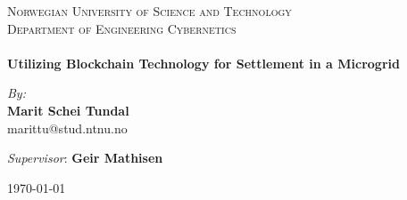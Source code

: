 
\begin{center}

\textsc{\LARGE Norwegian University of Science and Technology}\\[0.8cm] 
\textsc{\Large Department of Engineering Cybernetics}\\[0.6cm]

\HRule \\[0.4cm]
{ \huge \bfseries Utilizing Blockchain Technology for Settlement in a Microgrid}
\HRule \\[1.5cm]

\begin{center} \large
\emph{By:}\\
\textbf{Marit Schei Tundal}\\
marittu@stud.ntnu.no
\end{center}

\begin{center}\large
\emph{Supervisor}: \textbf{Geir Mathisen}
\end{center}


\vfill

\begin{figure}[!h]
    \centering
\end{figure}

\vfill

{\large \monthyear\today}

\end{center}
\newpage
